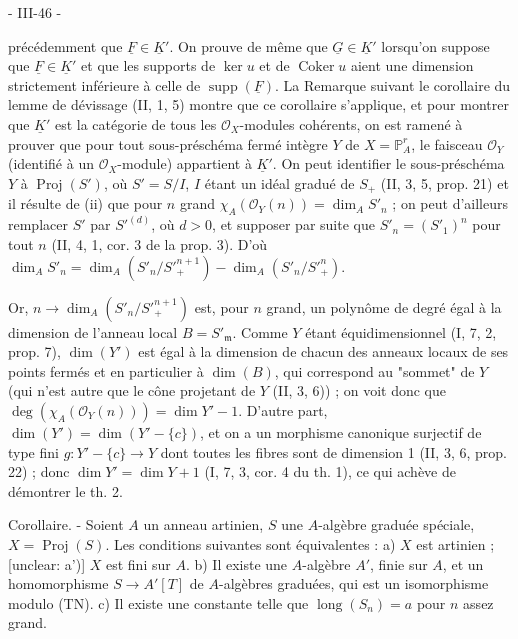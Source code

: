 \newpage


- III-46 -

précédemment que $\underline{F} \in \underline{K}'$. On prouve de même que $\underline{G} \in \underline{K}'$ lorsqu'on suppose que $\underline{F} \in \underline{K}'$ et que les supports de $\ker u$ et de $\operatorname{Coker} u$ aient une dimension strictement inférieure à celle de $\operatorname{supp}(\underline{F})$. La Remarque suivant le corollaire du lemme de dévissage (II, 1, 5) montre que ce corollaire s'applique, et pour montrer que $\underline{K}'$ est la catégorie de tous les $\mathcal{O}_X$-modules cohérents, on est ramené à prouver que pour tout sous-préschéma fermé intègre $Y$ de $X = \mathbb{P}^r_A$, le faisceau $\mathcal{O}_Y$ (identifié à un $\mathcal{O}_X$-module) appartient à $\underline{K}'$. On peut identifier le sous-préschéma $Y$ à $\operatorname{Proj}(S')$, où $S' = S/I$, $I$ étant un idéal gradué de $S_+$ (II, 3, 5, prop. 21) et il résulte de (ii) que pour $n$ grand $\chi_A(\mathcal{O}_Y(n)) = \dim_A S'_n$ ; on peut d'ailleurs remplacer $S'$ par $S'^{(d)}$, où $d > 0$, et supposer par suite que $S'_n = (S'_1)^n$ pour tout $n$ (II, 4, 1, cor. 3 de la prop. 3). D'où $\dim_A S'_n = \dim_A (S'_n / S'^{n+1}_+) - \dim_A (S'_n / S'^n_+)$.

Or, $n \to \dim_A (S'_n / S'^{n+1}_+)$ est, pour $n$ grand, un polynôme de degré égal à la dimension de l'anneau local $B = S'_{\mathfrak{m}}$. Comme $Y$ étant équidimensionnel (I, 7, 2, prop. 7), $\dim(Y')$ est égal à la dimension de chacun des anneaux locaux de ses points fermés et en particulier à $\dim(B)$, qui correspond au "sommet" de $Y$ (qui n'est autre que le cône projetant de $Y$ (II, 3, 6)) ; on voit donc que $\deg(\chi_A(\mathcal{O}_Y(n))) = \dim Y' - 1$. D'autre part, $\dim(Y') = \dim(Y' - \{c\})$, et on a un morphisme canonique surjectif de type fini $g : Y' - \{c\} \to Y$ dont toutes les fibres sont de dimension 1 (II, 3, 6, prop. 22) ; donc $\dim Y' = \dim Y + 1$ (I, 7, 3, cor. 4 du th. 1), ce qui achève de démontrer le th. 2.

Corollaire. - Soient $A$ un anneau artinien, $S$ une $A$-algèbre graduée spéciale, $X = \operatorname{Proj}(S)$. Les conditions suivantes sont équivalentes :
a) $X$ est artinien ; [unclear: a')] $X$ est fini sur $A$.
b) Il existe une $A$-algèbre $A'$, finie sur $A$, et un homomorphisme $S \to A'[T]$ de $A$-algèbres graduées, qui est un isomorphisme modulo (TN).
c) Il existe une constante telle que $\operatorname{long}(S_n) = a$ pour $n$ assez grand.

